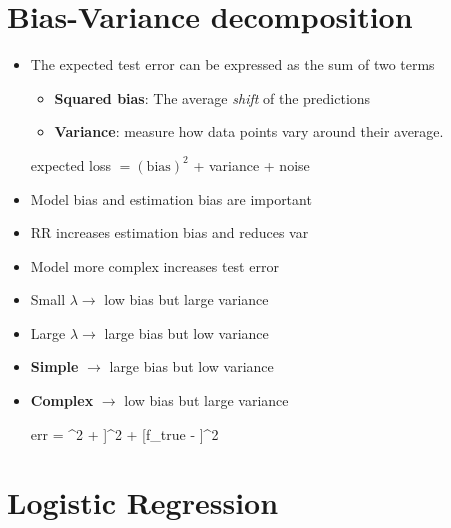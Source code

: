 \section{Bias-Variance decomposition}
\begin{itemize}
	\item The expected test error can be expressed as the sum of two terms
	\begin{itemize}
	 	\item \textbf{Squared bias}: The average \textit{shift} of the predictions 
	 	\item \textbf{Variance}: measure how data points vary around their average.
	 \end{itemize} 
	 \begin{center}
	 	expected loss $= (\text{bias})^2$ + variance + noise
	 \end{center}
	\item Model bias and estimation bias are important
	\item RR increases estimation bias and reduces var
	\item Model more complex increases test error
	\item Small $\lambda \rightarrow$ low bias but large variance
	\item Large $\lambda \rightarrow$ large bias but low variance
	\item {\bf Simple} $\rightarrow$ large bias but low variance
	\item {\bf Complex} $\rightarrow$ low bias but large variance
	\begin{myalign*}
	    err = \sigma^2 + \E[f_{lse} - \E[f_{lse}]]^2 + [f_{true} - \E[f_{lse}]]^2
	\end{myalign*}
\end{itemize}

\section{Logistic Regression}


